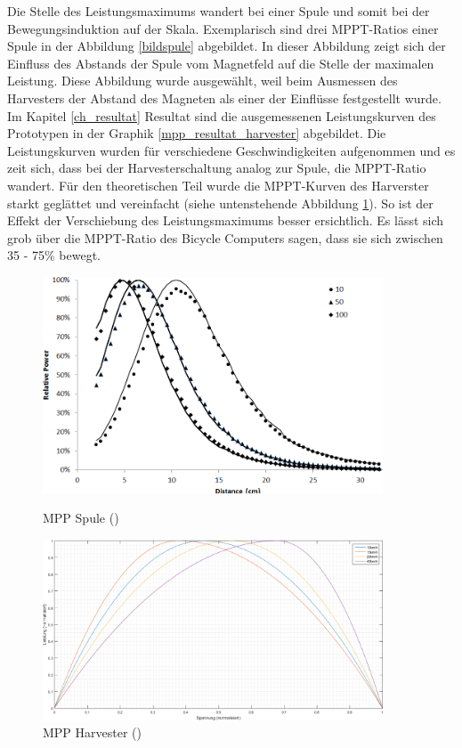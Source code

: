Die Stelle des Leistungsmaximums wandert bei einer Spule und somit bei der Bewegungsinduktion auf der Skala. Exemplarisch sind drei MPPT-Ratios einer Spule in der Abbildung \ref{bildspule} abgebildet. In dieser Abbildung zeigt sich der Einfluss des Abstands der Spule vom Magnetfeld auf die Stelle der maximalen Leistung. Diese Abbildung wurde ausgewählt, weil beim Ausmessen des Harvesters der Abstand des Magneten als einer der Einflüsse festgestellt wurde. Im Kapitel \ref{ch_resultat} Resultat sind die ausgemessenen Leistungskurven des Prototypen in der Graphik \ref{mpp_resultat_harvester} abgebildet. Die Leistungskurven wurden für verschiedene Geschwindigkeiten aufgenommen und es zeit sich, dass bei der Harvesterschaltung analog zur Spule, die MPPT-Ratio wandert. Für den theoretischen Teil wurde die MPPT-Kurven des Harverster starkt geglättet und vereinfacht (siehe untenstehende Abbildung \ref{bild_harvester}). So ist der Effekt der Verschiebung des Leistungsmaximums besser ersichtlich. Es lässt sich grob über die MPPT-Ratio des Bicycle Computers sagen, dass sie sich zwischen 35 - 75\thinspace\% bewegt.

\begin{figure}[ht]
 \begin{minipage}[t]{0.5\textwidth}
   \includegraphics[width=0.9\textwidth]{2TheoretischeGrundlagen/imag/MPPSpule.png}
   \caption{MPP Spule (\cite{MPP_Spule})}
   \label{bildspule} 
 \end{minipage}
 \begin{minipage}[t]{0.5\textwidth}
   \includegraphics[width=0.9\textwidth]{2TheoretischeGrundlagen/imag/MPPharvesterTheorie.png}
   \caption{MPP Harvester (\cite{MPP_Harv})}
   \label{bild_harvester} 
 \end{minipage}
\end{figure}


